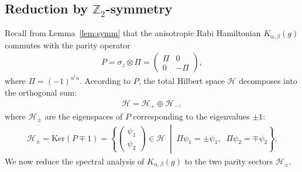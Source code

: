 \documentclass[12pt,dvipdfmx]{article}
\newcommand{\ZZ}{\mathbb{Z}}
\newcommand{\cH}{\mathcal{H}}
\newcommand{\Ker}{\mathrm{Ker}}
\begin{document}
\subsection{Reduction by $\ZZ_2$-symmetry}
%
%
Recall from Lemma~\ref{lem:symm} that the anisotropic Rabi Hamiltonian $K_{\alpha,\beta}(g)$ commutes with the parity operator
\begin{align*}
    P = \sigma_z \otimes \Pi = \begin{pmatrix} \Pi & 0\\ 0 & -\Pi \end{pmatrix},
\end{align*}
where $\Pi = (-1)^{a^\dagger a}$. 
According to $P$, the total Hilbert space
$\cH $ decomposes into the orthogonal sum:
\begin{align*}
    \cH  = \cH _+ \oplus \cH _-,
\end{align*}
where $\cH _\pm$ are the eigenspaces of $P$ corresponding to the eigenvalues $\pm 1$:
\begin{align*}
    \cH _\pm 
    = 
    \Ker(P \mp 1) 
    = 
    \left\{ 
        \begin{pmatrix} \psi_1\\ \psi_2 \end{pmatrix} \in \cH  
        \;\middle|\; 
        \Pi\psi_1 = \pm\psi_1, \;\; \Pi\psi_2 = \mp\psi_2 
    \right\}.
\end{align*}
We now reduce the spectral analysis of $K_{\alpha,\beta}(g)$ to the two parity sectors ${\cH _\pm}$.
\end{document}

